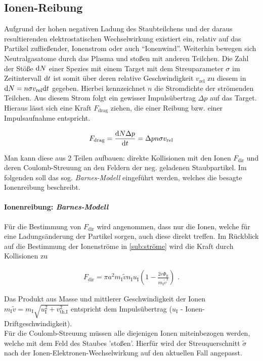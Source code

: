 \documentclass[numbers=noenddot,a4paper,notitlepage,twoside,BCOR15mm]{scrbook}
\newcommand{\diff}{\textnormal{d}}
\newcommand{\ix}[1]{_\text{#1}}
\newcommand{\tilt}[1]{\textit{#1}}
\begin{document}
		\subsection{Ionen-Reibung}\label{subsub:reibung}

			Aufgrund der hohen negativen Ladung des Staubteilchens und der daraus resultierenden elektrostatischen Wechselwirkung existiert ein, relativ auf das Partikel zufließender, Ionenstrom oder auch "`Ionenwind"'. Weiterhin bewegen sich Neutralgasatome durch das Plasma und stoßen mit anderen Teilchen. Die Zahl der Stöße $\diff N$ einer Spezies mit einem Target mit dem Streuparameter $\sigma$ im Zeitintervall $\diff t$ ist somit über deren relative Geschwindigkeit $v\ix{rel}$ zu diesem in $\diff N=n\sigma v\ix{rel}\diff t$ gegeben. Hierbei kennzeichnet $n$ die Stromdichte der strömenden Teilchen. Aus diesem Strom folgt ein gewisser Impulsübertrag $\Delta p$ auf das Target. Hieraus lässt sich eine Kraft $F\ix{drag}$ ziehen, die einer Reibung bzw. einer Impulsaufnahme entspricht.

				\begin{align}
					F\ix{drag}=\frac{\diff N \Delta p}{\diff t}=\Delta p n \sigma v\ix{rel}
				\end{align}

			 Man kann diese aus 2 Teilen aufbauen: direkte Kollisionen mit den Ionen $F\ix{dir}$ und deren Coulomb-Streuung an den Feldern der neg. geladenen Staubpartikel. Im folgenden soll das sog. \tilt{Barnes-Modell} eingeführt werden, welches die besagte Ionenreibung beschreibt.

				\paragraph{Ionenreibung: \tilt{Barnes-Modell}}

				Für die Bestimmung von $F\ix{dir}$ wird angenommen, dass nur die Ionen, welche für eine Ladungsänderung der Partikel sorgen, auch diese direkt treffen. Im Rückblick auf die Bestimmung der Ionenströme in \ref{sub:ströme} wird die Kraft durch Kollisionen zu

					\begin{align}
						F\ix{dir}=\pi a^2m\ix{I}\tilde{v}n\ix{I}u\ix{I}\left(1-\frac{2e\Phi\ix{fl}}{m\ix{I}\tilde{v}^2}\right)\,\,.
					\end{align}


				Das Produkt aus Masse und mittlerer Geschwindigkeit der Ionen $m\ix{I}\tilde{v}=m\ix{I}\sqrt{u\ix{I}^2+v\ix{th,I}^2}$ entspricht dem Impulsübertrag ($u\ix{I}$ - Ionen-Driftgeschwindigkeit).\\
				Für die Coulomb-Streuung müssen alle diejenigen Ionen miteinbezogen werden, welche mit dem Feld des Staubes 'stoßen'. Hierfür wird der Streuquerschnitt $\tilde{\sigma}$ nach \cite{Barnes92} der Ionen-Elektronen-Wechselwirkung auf den aktuellen Fall angepasst.
\end{document}
